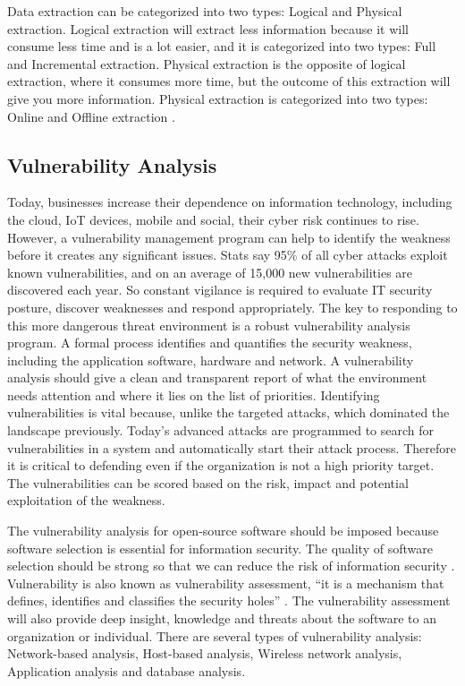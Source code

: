 Data extraction can be categorized into two types: Logical and Physical extraction. Logical extraction will extract less information because it will consume less time and is a lot easier, and it is categorized into two types: Full and Incremental extraction. Physical extraction is the opposite of logical extraction, where it consumes more time, but the outcome of this extraction will give you more information. Physical extraction is categorized into two types: Online and Offline extraction \cite{DataWH}.
%
\subsection{Vulnerability Analysis}
Today, businesses increase their dependence on information technology, including the cloud, IoT devices, mobile and social, their cyber risk continues to rise. However, a vulnerability management program can help to identify the weakness before it creates any significant issues. Stats say 95\% of all cyber attacks exploit known vulnerabilities, and on an average of 15,000 new vulnerabilities are discovered each year\cite{Rh2019}. So constant vigilance is required to evaluate IT security posture, discover weaknesses and respond appropriately. The key to responding to this more dangerous threat environment is a robust vulnerability analysis program. A formal process identifies and quantifies the security weakness, including the application software, hardware and network. A vulnerability analysis should give a clean and transparent report of what the environment needs attention and where it lies on the list of priorities. Identifying vulnerabilities is vital because, unlike the targeted attacks, which dominated the landscape previously. Today’s advanced attacks are programmed to search for vulnerabilities in a system and automatically start their attack process. Therefore it is critical to defending even if the organization is not a high priority target. The vulnerabilities can be scored based on the risk, impact and potential exploitation of the weakness.

The vulnerability analysis for open-source software should be imposed because software selection is essential for information security. The quality of software selection should be strong so that we can reduce the risk of information security \cite{KeJaSa2005}. Vulnerability is also known as vulnerability assessment, “it is a mechanism that defines, identifies and classifies the security holes” \cite{KeJaSa2005}. The vulnerability assessment will also provide deep insight, knowledge and threats about the software to an organization or individual. There are several types of vulnerability analysis: Network-based analysis, Host-based analysis, Wireless network analysis, Application analysis and database analysis.

